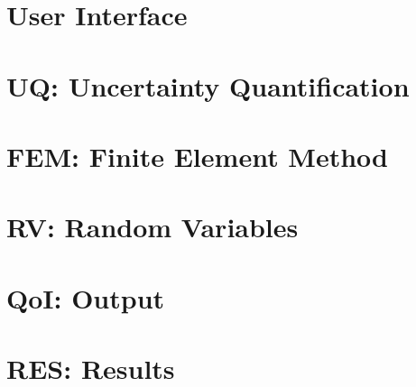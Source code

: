\section{User Interface}


\section{UQ: Uncertainty Quantification}
\label{sec:uq}


\section{FEM: Finite Element Method}
\label{sec:fem}


\section{RV: Random Variables}
\label{sec:rv_quofem}


\section{QoI: Output}
\label{sec:qoi_quofem}


\section{RES: Results}
\label{sec:res_quofem}

